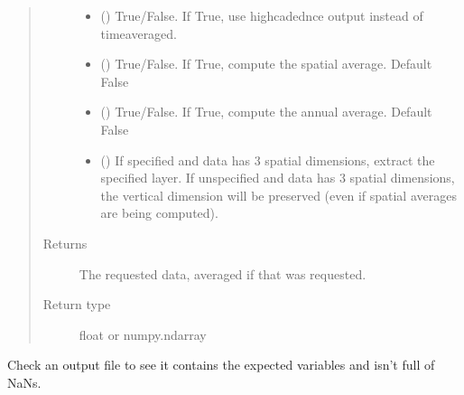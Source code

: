 \documentclass[letterpaper,10pt,english]{sphinxmanual}
\begin{document}
\begin{fulllineitems}
\begin{fulllineitems}
\begin{quote}
\begin{description}
\begin{itemize}
\item {} 
 (\sphinxstyleliteralemphasis{\sphinxupquote{, }}) \textendash{} True/False. If True, use high\sphinxhyphen{}cadednce output instead of time\sphinxhyphen{}averaged.

\item {} 
 (\sphinxstyleliteralemphasis{\sphinxupquote{, }}) \textendash{} True/False. If True, compute the spatial average. Default False

\item {} 
 (\sphinxstyleliteralemphasis{\sphinxupquote{, }}) \textendash{} True/False. If True, compute the annual average. Default False

\item {} 
 (\sphinxstyleliteralemphasis{\sphinxupquote{, }}) \textendash{} If specified and data has 3 spatial dimensions, extract the specified layer. If
unspecified and data has 3 spatial dimensions, the vertical dimension will be
preserved (even if spatial averages are being computed).

\end{itemize}

\item[{Returns}] \leavevmode
The requested data, averaged if that was requested.

\item[{Return type}] \leavevmode
float or numpy.ndarray

\end{description}\end{quote}

\end{fulllineitems}


\begin{fulllineitems}
\label{\detokenize{source/exoplasim:exoplasim.Model.integritycheck}}
Check an output file to see it contains the expected variables and isn’t full of NaNs.


\end{fulllineitems}
\end{fulllineitems}
\end{document}
